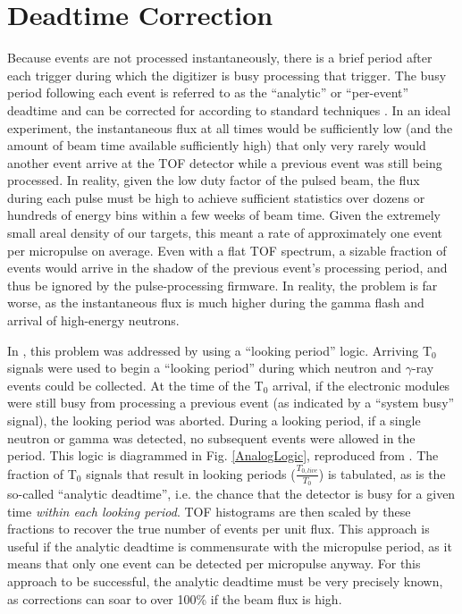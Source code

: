 \section{Deadtime Correction} \label{DeadtimeCorrection}
Because events are not processed instantaneously, there is a brief period
after each trigger during which the digitizer is busy processing that trigger.
The busy period following each event is referred to as the ``analytic'' or
``per-event'' deadtime and can be corrected for according to standard techniques \cite{Moore1980}.
In an ideal experiment, the instantaneous flux at all times would be
sufficiently low (and the amount of beam time available sufficiently high) that
only very rarely would another event arrive at the TOF detector while
a previous event was still being processed. In reality, given the low duty
factor of the pulsed beam, the flux during each pulse must be high to achieve sufficient
statistics over dozens or hundreds of energy bins within a few weeks of beam
time. Given the extremely small areal density of our targets, this meant a rate
of approximately one event per micropulse on average. Even with a flat
TOF spectrum, a sizable fraction of events would arrive in the shadow
of the previous event's processing period, and thus be ignored by the pulse-processing firmware.
In reality, the
problem is far worse, as the instantaneous flux is much higher during the gamma
flash and arrival of high-energy neutrons.

In \cite{Finlay1993, Abfalterer2001}, this problem was addressed by using a
``looking period'' logic. Arriving T$_{0}$ signals were used to begin a ``looking 
period'' during which neutron and $\gamma$-ray
events could be collected. At the time of the T$_{0}$ arrival, if the electronic modules
were still busy from processing a previous event (as indicated by a ``system
busy'' signal),
the looking period was aborted. During a looking period, if a single neutron or gamma
was detected, no subsequent events were allowed in the period.
This logic is diagrammed in Fig. \ref{AnalogLogic}, reproduced from
\cite{Abfalterer2001}. The fraction of T$_{0}$ signals that result in looking
periods ($\frac{T_{0,live}}{T_{0}}$) is tabulated, as is the so-called ``analytic deadtime'', i.e. 
the chance that the detector is busy for a given time \textit{within each looking period}.
TOF histograms are then scaled by these
fractions to recover the true number of events per unit flux. This approach is useful if the
analytic deadtime is commensurate with the micropulse period, as it means that
only one event can be detected per micropulse anyway. For this approach to be successful, the
analytic deadtime must be very precisely known, as corrections can soar to over 100\%
if the beam flux is high.

